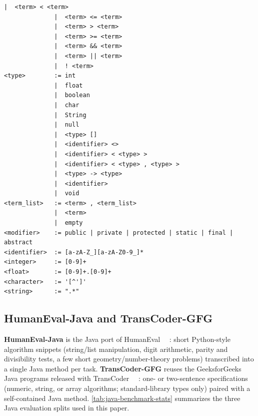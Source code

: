 \documentclass[manuscript,screen]{acmart}
\begin{document}
\begin{tcolorbox}[
    enhanced,
    breakable,
    colback=blue!5!white,
    colframe=blue!50!black,
    title=Java Subset Language Grammar,
    fonttitle=\bfseries,
    boxrule=1pt,
    arc=3pt
]
\begin{Verbatim}[fontsize=\small]
              |  <term> < <term>
              |  <term> <= <term>
              |  <term> > <term>
              |  <term> >= <term>
              |  <term> && <term>
              |  <term> || <term>
              |  ! <term>
<type>        := int
              |  float
              |  boolean
              |  char
              |  String
              |  null
              |  <type> []
              |  <identifier> <>
              |  <identifier> < <type> >
              |  <identifier> < <type> , <type> >
              |  <type> -> <type>
              |  <identifier>
              |  void
<term_list>   := <term> , <term_list>
              |  <term>
              |  empty
<modifier>    := public | private | protected | static | final | abstract
<identifier>  := [a-zA-Z_][a-zA-Z0-9_]*
<integer>     := [0-9]+
<float>       := [0-9]+.[0-9]+
<character>   := '[^']'
<string>      := ".*"
\end{Verbatim}
\end{tcolorbox}

 \subsection{{\color{revblue}HumanEval-Java and TransCoder-GFG}}

\textbf{\color{revblue}HumanEval-Java} {\color{revblue}is the Java port of HumanEval~\mbox{%
\cite{DBLP:journals/corr/abs-2107-03374}}\hskip0pt%
: short Python-style algorithm snippets (string/list manipulation, digit arithmetic, parity and divisibility tests, a few short geometry/number-theory problems) transcribed into a single Java method per task. }\textbf{\color{revblue}TransCoder-GFG} {\color{revblue}reuses the GeeksforGeeks Java programs released with TransCoder~\mbox{%
\cite{DBLP:conf/nips/LachauxROC20}}\hskip0pt%
: one- or two-sentence specifications (numeric, string, or array algorithms; standard-library types only) paired with a self-contained Java method. }\autoref{tab:java-benchmark-stats} {\color{revblue}summarizes the three Java evaluation splits used in this paper.
}
\end{document}
